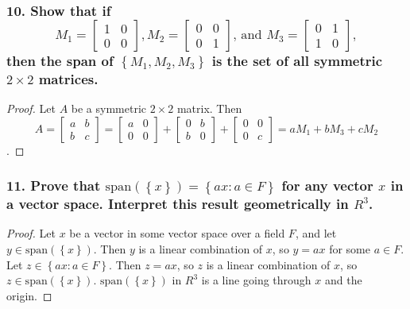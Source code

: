 \documentclass{article}
\begin{document}
\subsubsection*{10. Show that if \[
	M_1 = \begin{bmatrix}
		1 & 0 \\ 0 & 0
	\end{bmatrix}, M_2 = \begin{bmatrix}
		0 & 0 \\ 0 & 1
	\end{bmatrix}\text{, and } M_3 = \begin{bmatrix}
		0 & 1 \\ 1 & 0
	\end{bmatrix},
\] then the span of $\left\{M_1, M_2, M_3\right\}$ is the set of all symmetric $2 \times 2$ matrices.}
\begin{proof}
	Let $A$ be a symmetric $2 \times 2$ matrix. Then \[
		A = \begin{bmatrix}
			a & b \\ b & c
		\end{bmatrix} = \begin{bmatrix}
			a & 0 \\ 0 & 0
		\end{bmatrix} + \begin{bmatrix}
			0 & b \\ b & 0
		\end{bmatrix} + \begin{bmatrix}
			0 & 0 \\ 0 & c
		\end{bmatrix} = aM_1 + bM_3 + cM_2
	\].
\end{proof}

\subsubsection*{11. Prove that $\text{span}(\left\{x\right\}) = \left\{ax: a \in F\right\}$ for any vector $x$ in a vector space. Interpret this result geometrically in $R^3$.}
\begin{proof}
	Let $x$ be a vector in some vector space over a field $F$, and let $y \in \text{span}(\left\{x\right\})$. Then $y$ is a linear combination of $x$, so $y = ax$ for some $a \in F$. Let $z \in \left\{ax: a \in F\right\}$. Then $z = ax$, so $z$ is a linear combination of $x$, so $z \in \text{span}(\left\{x\right\})$. $\text{span}(\left\{x\right\})$ in $R^3$ is a line going through $x$ and the origin.
\end{proof}
\end{document}
